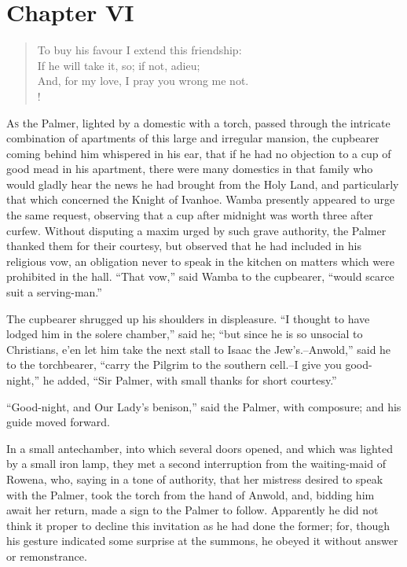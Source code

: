 \chapter{Chapter VI}

\begin{verse}
To buy his favour I extend this friendship:\\
If he will take it, so; if not, adieu;\\
And, for my love, I pray you wrong me not.\\!
\end{verse}

\lettrine{A}{s} the Palmer, lighted by a domestic with a torch, passed
through the
intricate combination of apartments of this large and irregular mansion,
the cupbearer coming behind him whispered in his ear, that if he had no
objection to a cup of good mead in his apartment, there were many
domestics in that family who would gladly hear the news he had brought
from the Holy Land, and particularly that which concerned the Knight of
Ivanhoe. Wamba presently appeared to urge the same request, observing
that a cup after midnight was worth three after curfew. Without
disputing a maxim urged by such grave authority, the Palmer thanked them
for their courtesy, but observed that he had included in his religious
vow, an obligation never to speak in the kitchen on matters which were
prohibited in the hall. ``That vow,'' said Wamba to the cupbearer,
``would scarce suit a serving-man.''

The cupbearer shrugged up his shoulders in displeasure. ``I thought to
have lodged him in the solere chamber,'' said he; ``but since he is so
unsocial to Christians, e'en let him take the next stall to Isaac the
Jew's.--Anwold,'' said he to the torchbearer, ``carry the Pilgrim to the
southern cell.--I give you good-night,'' he added, ``Sir Palmer, with
small thanks for short courtesy.''

``Good-night, and Our Lady's benison,'' said the Palmer, with composure;
and his guide moved forward.

In a small antechamber, into which several doors opened, and which was
lighted by a small iron lamp, they met a second interruption from the
waiting-maid of Rowena, who, saying in a tone of authority, that her
mistress desired to speak with the Palmer, took the torch from the hand
of Anwold, and, bidding him await her return, made a sign to the Palmer
to follow. Apparently he did not think it proper to decline this
invitation as he had done the former; for, though his gesture indicated
some surprise at the summons, he obeyed it without answer or
remonstrance.

